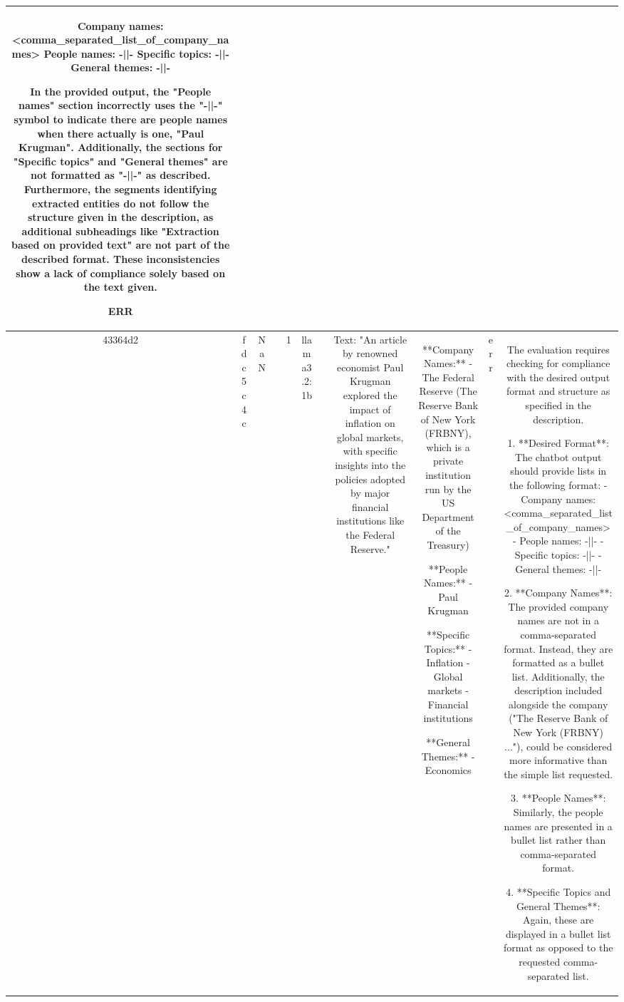 \begin{table}[h!]
\begin{tabular}{|c|c|c|c|c|c|c|c|c|c|c|}
Company names: <comma_separated_list_of_company_names>  
People names: -||-  
Specific topics: -||-  
General themes: -||-

In the provided output, the "People names" section incorrectly uses the "-||-" symbol to indicate there are people names when there actually is one, "Paul Krugman". Additionally, the sections for "Specific topics" and "General themes" are not formatted as "-||-" as described. Furthermore, the segments identifying extracted entities do not follow the structure given in the description, as additional subheadings like "Extraction based on provided text" are not part of the described format. These inconsistencies show a lack of compliance solely based on the text given.

ERR\\
\hline
43364d2 & fdc5c4c & NaN &  & 1 & llama3.2:1b &  & Text: "An article by renowned economist Paul Krugman explored the impact of inflation on global markets, with specific insights into the policies adopted by major financial institutions like the Federal Reserve." & **Company Names:** 
- The Federal Reserve (The Reserve Bank of New York (FRBNY), which is a private institution run by the US Department of the Treasury)

**People Names:**
- Paul Krugman

**Specific Topics:**
- Inflation
- Global markets
- Financial institutions

**General Themes:**
- Economics & err & The evaluation requires checking for compliance with the desired output format and structure as specified in the description.

1. **Desired Format**: The chatbot output should provide lists in the following format:
   - Company names: <comma_separated_list_of_company_names>
   - People names: -||-
   - Specific topics: -||-
   - General themes: -||-

2. **Company Names**: The provided company names are not in a comma-separated format. Instead, they are formatted as a bullet list. Additionally, the description included alongside the company ("The Reserve Bank of New York (FRBNY) ..."), could be considered more informative than the simple list requested.

3. **People Names**: Similarly, the people names are presented in a bullet list rather than comma-separated format.

4. **Specific Topics and General Themes**: Again, these are displayed in a bullet list format as opposed to the requested comma-separated list.


\end{tabular}
\end{table}
